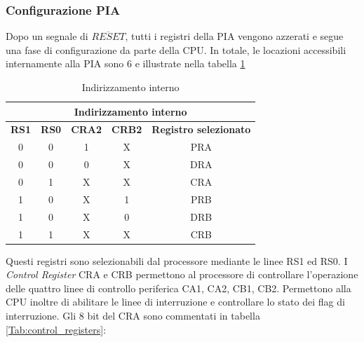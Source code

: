 \subsubsection{Configurazione PIA}
Dopo un segnale di $\overline{RESET}$, tutti i registri della PIA vengono azzerati e segue una fase di configurazione da parte della CPU. In totale, le locazioni accessibili internamente alla PIA sono 6 e illustrate nella tabella \ref{Tab:reg_ind_1}



\begin{table} [ht]
    \centering
    \begin{tabular}{|c|c|c|c|c|}
        \hline
        \multicolumn{5}{|c|}{\textbf{Indirizzamento interno}} \\ \hline
        \textbf{RS1} & \textbf{RS0} & \textbf{CRA2} & \textbf{CRB2} & \textbf{Registro selezionato}\\ \hline
        0       &0      &1      &X      &PRA    \\  \hline
        0       &0      &0      &X      &DRA    \\  \hline
        0       &1      &X      &X      &CRA    \\  \hline
        1       &0      &X      &1      &PRB    \\  \hline
        1       &0      &X      &0      &DRB    \\  \hline
        1       &1      &X      &X      &CRB    \\  \hline
    \end{tabular}
    \caption{Indirizzamento interno}
    \label{Tab:reg_ind_1}
\end{table}

Questi registri sono selezionabili dal processore mediante le linee RS1 ed RS0.
I \textit{Control Register} CRA e CRB permettono al processore di controllare l'operazione delle quattro linee di controllo periferica CA1, CA2, CB1, CB2. Permettono alla CPU inoltre di abilitare le linee di interruzione e controllare lo stato dei flag di interruzione. 
Gli 8 bit del CRA sono commentati in tabella \ref{Tab:control_registers}:

